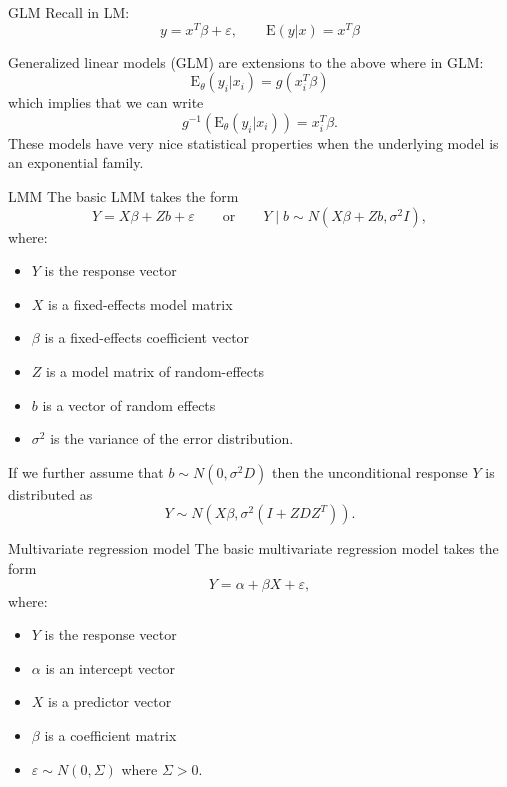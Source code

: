 \documentclass[
  ignorenonframetext,
]{beamer}
\providecommand{\tightlist}{%
  \setlength{\itemsep}{0pt}\setlength{\parskip}{0pt}}
\begin{document}
\begin{frame}{GLM}
\protect\hypertarget{glm}{}
Recall in LM: \[
   y = x^T\beta + \varepsilon, \qquad \text{E}(y|x) = x^T\beta
\]

\vspace*{12pt}

Generalized linear models (GLM) are extensions to the above where in
GLM: \[
 \text{E}_\theta(y_i|x_i) = g(x_i^T\beta) 
\] which implies that we can write \[
  g^{-1}\left(\text{E}_\theta(y_i|x_i)\right) = x_i^T\beta.
\] These models have very nice statistical properties when the
underlying model is an exponential family.
\end{frame}

\begin{frame}{LMM}
\protect\hypertarget{lmm}{}
The basic LMM takes the form \[
  Y = X\beta + Zb + \varepsilon \qquad \text{or} \qquad Y\mid b \sim N(X\beta + Zb, \sigma^2I),
\] where:

\begin{itemize}
\tightlist
\item
  \(Y\) is the response vector
\item
  \(X\) is a fixed-effects model matrix
\item
  \(\beta\) is a fixed-effects coefficient vector
\item
  \(Z\) is a model matrix of random-effects
\item
  \(b\) is a vector of random effects
\item
  \(\sigma^2\) is the variance of the error distribution.
\end{itemize}

If we further assume that \(b \sim N(0, \sigma^2D)\) then the
unconditional response \(Y\) is distributed as \[
  Y \sim N(X\beta, \sigma^2(I + ZDZ^T)).
\]
\end{frame}

\begin{frame}{Multivariate regression model}
\protect\hypertarget{multivariate-regression-model}{}
The basic multivariate regression model takes the form \[
  Y = \alpha +\beta X  + \varepsilon,
\] where:

\begin{itemize}
\tightlist
\item
  \(Y\) is the response vector
\item
  \(\alpha\) is an intercept vector
\item
  \(X\) is a predictor vector
\item
  \(\beta\) is a coefficient matrix
\item
  \(\varepsilon \sim N(0, \Sigma)\) where \(\Sigma > 0\).
\end{itemize}
\end{frame}
\end{document}
